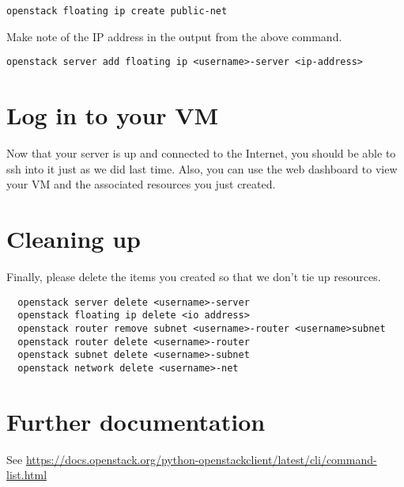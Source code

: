 \documentclass{article}
\begin{document}
  \texttt{openstack floating ip create public-net}
  
Make note of the IP address in the output from the above command.

 \texttt{openstack server add floating ip <username>-server <ip-address>}


\section{Log in to your VM}
Now that your server is up and connected to the Internet, you should be able to ssh into it just as we did last time. Also, you can use the web dashboard to view your VM and the associated resources you just created.

\section{Cleaning up}
Finally, please delete the items you created so that we don't tie up resources.

\begin{verbatim}
  openstack server delete <username>-server
  openstack floating ip delete <io address>
  openstack router remove subnet <username>-router <username>subnet
  openstack router delete <username>-router
  openstack subnet delete <username>-subnet
  openstack network delete <username>-net
\end{verbatim}

\section{Further documentation}
 
 See \url{https://docs.openstack.org/python-openstackclient/latest/cli/command-list.html}
 
 
\end{document}
